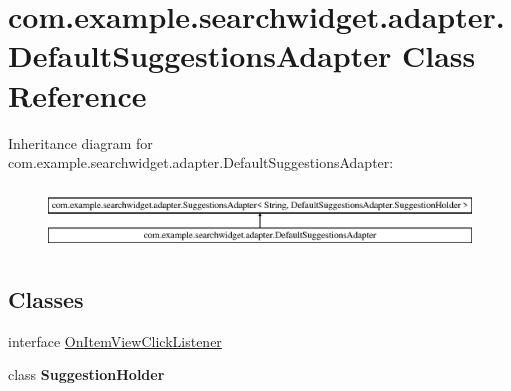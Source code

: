 \hypertarget{classcom_1_1example_1_1searchwidget_1_1adapter_1_1_default_suggestions_adapter}{}\section{com.\+example.\+searchwidget.\+adapter.\+Default\+Suggestions\+Adapter Class Reference}
\label{classcom_1_1example_1_1searchwidget_1_1adapter_1_1_default_suggestions_adapter}
Inheritance diagram for com.\+example.\+searchwidget.\+adapter.\+Default\+Suggestions\+Adapter\+:\begin{figure}[H]
\begin{center}
\leavevmode
\includegraphics[height=1.699545cm]{classcom_1_1example_1_1searchwidget_1_1adapter_1_1_default_suggestions_adapter}
\end{center}
\end{figure}
\subsection*{Classes}
\begin{DoxyCompactItemize}
\item 
interface \mbox{\hyperlink{interfacecom_1_1example_1_1searchwidget_1_1adapter_1_1_default_suggestions_adapter_1_1_on_item_view_click_listener}{On\+Item\+View\+Click\+Listener}}
\item 
class {\bfseries Suggestion\+Holder}
\end{DoxyCompactItemize}
